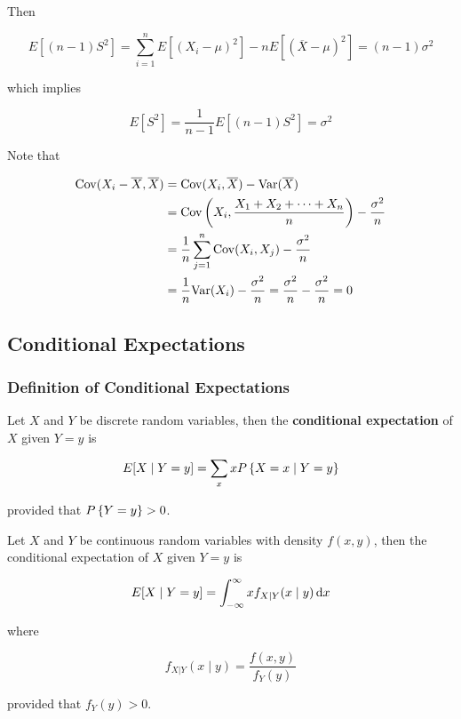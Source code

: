 \documentclass[a4paper,12pt]{article}
\begin{document}
\begin{exm}
  Then

  $$E[(n-1)S^{2}]=\sum_{i=1}^{n}E[(X_{i}-\mu)^{2}]-nE[(\overline{X}-\mu)^{2}]=(n-1)\sigma^{2}$$\s

  which implies

  $$E[S^{2}]=\frac{1}{n-1}E[(n-1)S^{2}]=\sigma^{2}$$\s

   Note that

  $$\begin{aligned}[t]
    \mathrm{Cov}(X_{i}-\overline{X},\overline{X})&=\mathrm{Cov}(X_{i},\overline{X})-\mathrm{Var}(\overline{X})\\
    &=\mathrm{Cov}\left( X_{i},\frac{X_{1}+X_{2}+\cdots+X_{n}}{n}\right)-\frac{\sigma^{2}}{n}\\
    &=\frac{1}{n}\sum_{j=1}^{n}\mathrm{Cov}(X_{i},X_{j})-\frac{\sigma^{2}}{n}\\
    &=\frac{1}{n}\mathrm{Var}(X_{i})-\frac{\sigma^{2}}{n}=\frac{\sigma^{2}}{n}-\frac{\sigma^{2}}{n}=0
  \end{aligned}$$
\end{exm}

\subsection{Conditional Expectations}
\subsubsection{Definition of Conditional Expectations}
\begin{dft}
  Let $X$ and $Y$ be discrete random variables, then the \textbf{conditional expectation} of $X$ given $Y=y$ is

  $$E[X\mid Y=y]=\sum_{x}xP\left\{ X=x\mid Y=y\right\}$$\s

  provided that $P\left\{ Y=y\right\}>0$.
\end{dft}\n

\begin{dft}
  Let $X$ and $Y$ be continuous random variables with density $f(x,y)$, then the conditional expectation of $X$ given $Y=y$ is

  $$E[X\mid Y=y]=\int_{-\infty}^{\infty}xf_{X|Y}(x\mid y)\,\mathrm{d} x$$\s

  where
  
  $$f_{X|Y}(x\mid y)=\frac{f(x,y)}{f_{Y}(y)}$$\s
  
  provided that $f_{Y}(y)>0$.
\end{dft}\n
\end{document}

